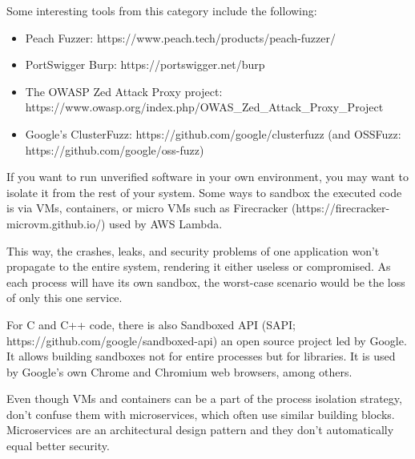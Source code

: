 Some interesting tools from this category include the following:

\begin{itemize}
\item 
Peach Fuzzer: https://www.peach.tech/products/peach-fuzzer/

\item 
PortSwigger Burp: https://portswigger.net/burp

\item 
The OWASP Zed Attack Proxy project: https://www.owasp.org/index.php/OWAS\_Zed\_Attack\_Proxy\_Project

\item 
Google's ClusterFuzz: https://github.com/google/clusterfuzz (and OSSFuzz: https://github.com/google/oss-fuzz)
\end{itemize}


If you want to run unverified software in your own environment, you may want to isolate it from the rest of your system. Some ways to sandbox the executed code is via VMs, containers, or micro VMs such as Firecracker (https://firecracker-microvm.github.io/) used by AWS Lambda.

This way, the crashes, leaks, and security problems of one application won't propagate to the entire system, rendering it either useless or compromised. As each process will have its own sandbox, the worst-case scenario would be the loss of only this one service.

For C and C++ code, there is also Sandboxed API (SAPI; https://github.com/google/sandboxed-api) an open source project led by Google. It allows building sandboxes not for entire processes but for libraries. It is used by Google's own Chrome and Chromium web browsers, among others.

Even though VMs and containers can be a part of the process isolation strategy, don't confuse them with microservices, which often use similar building blocks. Microservices are an architectural design pattern and they don't automatically equal better security.

















